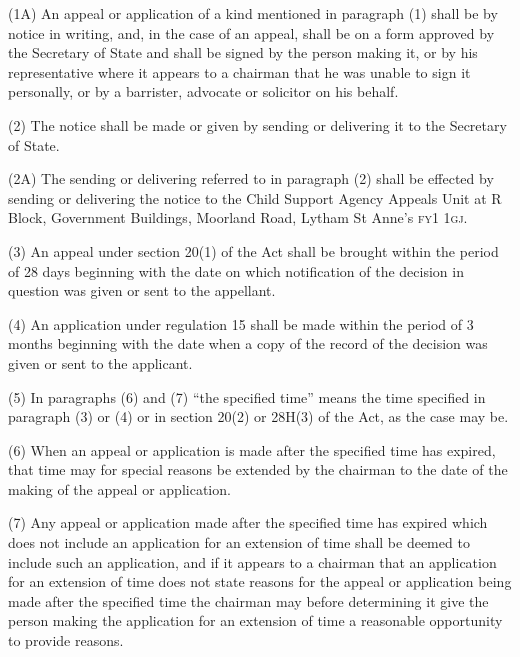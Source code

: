\documentclass[12pt,a4paper]{article}
\begin{document}

(1A) An appeal or application of a kind mentioned in paragraph (1) shall be by notice in writing, and, in the case of an appeal, shall be on a form approved by the Secretary of State and shall be signed by the person making it, or by his representative where it appears to a chairman that he was unable to sign it personally, or by a barrister, advocate or solicitor on his behalf.

(2) The notice shall be made or given by sending or delivering it to the 
Secretary of State.  %

(2A) The sending or delivering referred to in paragraph (2) shall be effected by sending or delivering the notice to the Child Support Agency Appeals Unit at R Block, Government Buildings, Moorland Road, Lytham St Anne’s 
\textsc{\lowercase{FY1 1GJ}}.  %

(3) An appeal under section 20(1) of the Act shall be brought within the period of 28 days beginning with the date on which notification of the decision in question was given or sent to the appellant.

(4) An application under regulation 15 shall be made within the period of 3 months beginning with the date when a copy of the record of the decision was given or sent to the applicant.

(5) In paragraphs (6) and (7) “the specified time” means the time specified in paragraph (3) or
(4) or in section 20(2) or 28H(3) of the Act, as the case may be.  %

(6) When an appeal or application is made after the specified time has expired, that time may for special reasons be extended by the chairman to the date of the making of the appeal or application.

(7) Any appeal or application made after the specified time has expired which does not include an application for an extension of time shall be deemed to include such an application, and if it appears to a chairman that an application for an extension of time does not state reasons for the appeal or application being made after the specified time the chairman may before determining it give the person making the application for an extension of time a reasonable opportunity to provide reasons.
\end{document}
